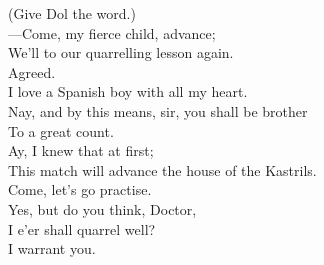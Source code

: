 \documentclass[a4paper,oneside,12pt]{memoir}
\begin{document}
\begin{drama*}
\subtlespeaks (Give Dol the word.)\\
 ---Come, my fierce child, advance;\\
We'll to our quarrelling lesson again.\\
\kastrilspeaks {} Agreed.\\
I love a Spanish boy with all my heart.\\
\subtlespeaks Nay, and by this means, sir, you shall be brother\\
To a great count.\\
\kastrilspeaks {} Ay, I knew that at first;\\
This match will advance the house of the Kastrils.\\
\subtlespeaks Come, let's go practise.\\
\kastrilspeaks {} Yes, but do you think, Doctor,\\
I e'er shall quarrel well?\\
\subtlespeaks {} I warrant you.\\

\pagebreak
\scene


\end{drama*}
\end{document}
